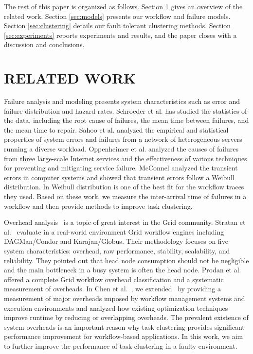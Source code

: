 \documentclass{IOS-Book-Article}
\begin{document}
The rest of this paper is organized as follows. Section \ref{sec:related} gives an overview of the related work. Section \ref{sec:models} presents our workflow and failure models. Section \ref{sec:clustering} details our fault tolerant clustering methods. Section \ref{sec:experiments} reports experiments and results, and the paper closes with a discussion and conclusions. 


\section{RELATED WORK}
\label{sec:related}

Failure analysis and modeling \cite{Tang1990} presents system characteristics such as error and failure distribution and hazard rates. Schroeder et al. \cite{Schroeder2006} has studied the statistics of the data, including the root cause of failures, the mean time between failures, and the mean time to repair. Sahoo et al. \cite{Sahoo2004} analyzed the empirical and statistical properties of system errors and failures from a network of heterogeneous servers running a diverse workload. Oppenheimer et al. \cite{Oppenheimer2002} analyzed the causes of failures from three large-scale Internet services and the effectiveness of various techniques for preventing and mitigating service failure. McConnel \cite{McConnel} analyzed the transient errors in computer systems and showed that transient errors follow a Weibull distribution. In \cite{Sun2003, Iosup2008} Weibull distribution is one of the best fit for the workflow traces they used.  Based on these work, we measure the inter-arrival time of failures in a workflow and then provide methods to improve task clustering.  

Overhead analysis~\cite{Ostberg2011, Prodan2008} is a topic of great interest in the Grid community. Stratan et al.~\cite{Stratan2008} evaluate in a real-world environment Grid workflow engines including DAGMan/Condor and Karajan/Globus. Their methodology focuses on five system characteristics: overhead, raw performance, stability, scalability, and reliability. They pointed out that head node consumption should not be negligible and the main bottleneck in a busy system is often the head node. Prodan et al.~\cite{Prodan2008} offered a complete Grid workflow overhead classification and a systematic measurement of overheads. In Chen et al.~\cite{Chen2011}, we extended~\cite{Prodan2008} by providing a measurement of major overheads imposed by workflow management systems and execution environments and analyzed how existing optimization techniques improve runtime by reducing or overlapping overheads. The prevalent existence of system overheads is an important reason why task clustering provides significant performance improvement for workflow-based applications. In this work, we aim to further improve the performance of task clustering in a faulty environment. 
\end{document}
